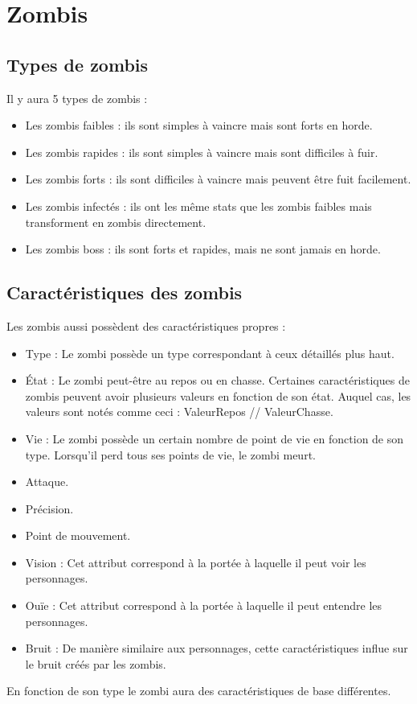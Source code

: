 \section{Zombis}
\subsection{Types de zombis}
Il y aura 5 types de zombis :
\begin{itemize}
  \item Les zombis faibles : ils sont simples à vaincre mais sont forts en horde.
  \item Les zombis rapides : ils sont simples à vaincre mais sont difficiles à fuir.
  \item Les zombis forts : ils sont difficiles à vaincre mais peuvent être fuit facilement.
  \item Les zombis infectés : ils ont les même stats que les zombis faibles mais transforment en zombis directement.
  \item Les zombis boss : ils sont forts et rapides, mais ne sont jamais en horde.
\end{itemize}
\subsection{Caractéristiques des zombis}
Les zombis aussi possèdent des caractéristiques propres :
\begin{itemize}
  \item Type : Le zombi possède un type correspondant à ceux détaillés plus haut.
  \item État : Le zombi peut-être au repos ou en chasse. Certaines caractéristiques de zombis peuvent avoir plusieurs valeurs en fonction de son état. Auquel cas, les valeurs sont notés comme ceci : ValeurRepos // ValeurChasse.
  \item Vie : Le zombi possède un certain nombre de point de vie en fonction de son type. Lorsqu'il perd tous ses points de vie, le zombi meurt.
  \item Attaque.
  \item Précision.
  \item Point de mouvement.
  \item Vision : Cet attribut correspond à la portée à laquelle il peut voir les personnages.
  \item Ouïe : Cet attribut correspond à la portée à laquelle il peut entendre les personnages.
  \item Bruit : De manière similaire aux personnages, cette caractéristiques influe sur le bruit créés par les zombis.
\end{itemize}
En fonction de son type le zombi aura des caractéristiques de base différentes.
